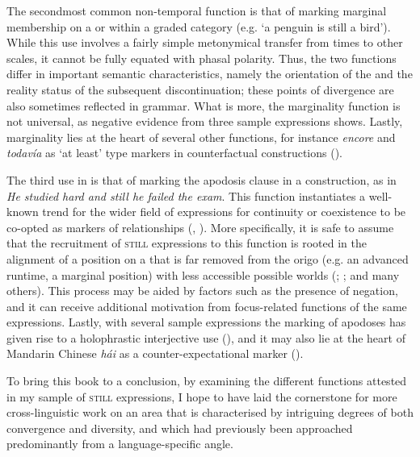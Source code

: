 The secondmost common non-temporal function is that of marking marginal membership on a  or within a graded category (e.g. \lq a penguin is still a bird\rq{}). While this use involves a fairly simple metonymical transfer from times to other scales, it cannot be fully equated with phasal polarity. Thus, the two functions differ in important semantic characteristics, namely the orientation of the  and the reality status of the subsequent discontinuation; these points of divergence are also sometimes reflected in grammar. What is more, the marginality function is not universal, as negative evidence from three sample expressions shows. Lastly, marginality lies  at the heart of several other functions, for instance  \textit{encore} and  \textit{todavía} as \lq at least\rq{ }type markers in counterfactual  constructions ().

The third use in  is that of marking the apodosis clause in a  construction, as in \textit{He studied hard and still he failed the exam}. This function instantiates a well-known trend for the wider field of expressions for continuity or coexistence to be co-opted as markers of  relationships (\cite{Koenig1985}, \citeyear{KoenigConcessives}). More specifically, it is safe to assume that the recruitment of \textsc{still} expressions to this function is rooted in the alignment of a position on a  that is far removed from the origo (e.g. an advanced runtime, a marginal position) with less accessible possible worlds (\cite{EderlyCurco2016}; \cite{Michaelis1993}; and many others). This process may be aided by factors such as the presence of negation, and it can receive additional motivation from focus-related functions of the same expressions. Lastly, with several sample expressions the marking of  apodoses has given rise to a holophrastic interjective use (), and it may also lie at the heart of Mandarin Chinese \textit{hái} as a counter-expectational marker ().

To bring this book to a conclusion, by examining the different functions attested in my sample of \textsc{still} expressions, I hope to have laid the cornerstone for more cross-linguistic work on an area that is characterised by intriguing degrees of both convergence and diversity, and which had previously been approached predominantly from a language-specific angle.
